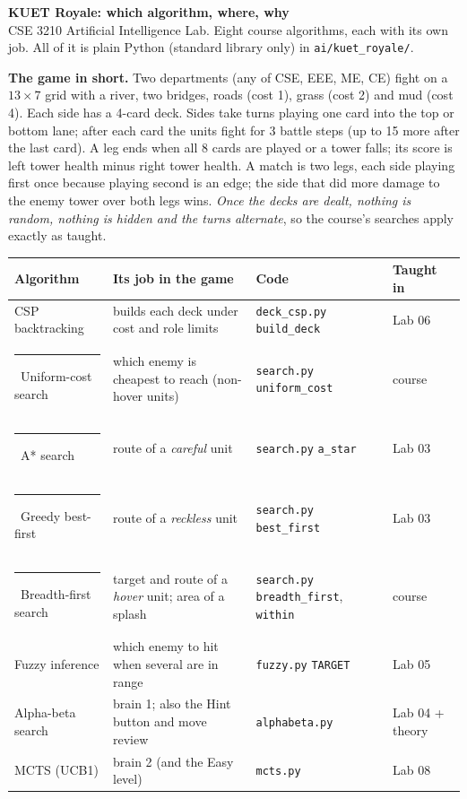 \documentclass[10pt,a4paper]{article}
\newcommand{\swatch}[1]{\textcolor{#1}{\rule{7pt}{7pt}}}
\begin{document}
{\color{navy}\LARGE\bfseries KUET Royale: which algorithm, where, why}\\[2pt]
{\color{soft}CSE 3210 Artificial Intelligence Lab. Eight course algorithms, each with its own job. All of it is plain Python (standard library only) in \texttt{ai/kuet\_royale/}.}

\vspace{6pt}
\textbf{The game in short.} Two departments (any of CSE, EEE, ME, CE) fight on a $13\times7$ grid with a river, two bridges, roads (cost 1), grass (cost 2) and mud (cost 4). Each side has a 4-card deck. Sides take turns playing one card into the top or bottom lane; after each card the units fight for 3 battle steps (up to 15 more after the last card). A leg ends when all 8 cards are played or a tower falls; its score is left tower health minus right tower health. A match is two legs, each side playing first once because playing second is an edge; the side that did more damage to the enemy tower over both legs wins. \emph{Once the decks are dealt, nothing is random, nothing is hidden and the turns alternate}, so the course's searches apply exactly as taught.

\vspace{4pt}
\begin{tabular}{@{}>{\raggedright\arraybackslash}p{3.75cm}>{\raggedright\arraybackslash}p{6.05cm}>{\raggedright\arraybackslash}p{4.15cm}>{\raggedright\arraybackslash}p{2.75cm}@{}}
\toprule
\textbf{Algorithm} & \textbf{Its job in the game} & \textbf{Code} & \textbf{Taught in}\\
\midrule
CSP backtracking & builds each deck under cost and role limits & \texttt{deck\_csp.py} \texttt{build\_deck} & Lab 06\\
\swatch{ucs}\ Uniform-cost search & which enemy is cheapest to reach (non-hover units) & \texttt{search.py} \texttt{uniform\_cost} & course\\
\swatch{astar}\ A* search & route of a \emph{careful} unit & \texttt{search.py} \texttt{a\_star} & Lab 03\\
\swatch{greedy}\ Greedy best-first & route of a \emph{reckless} unit & \texttt{search.py} \texttt{best\_first} & Lab 03\\
\swatch{bfs}\ Breadth-first search & target and route of a \emph{hover} unit; area of a splash & \texttt{search.py} \texttt{breadth\_first}, \texttt{within} & course\\
Fuzzy inference & which enemy to hit when several are in range & \texttt{fuzzy.py} \texttt{TARGET} & Lab 05\\
Alpha-beta search & brain 1; also the Hint button and move review & \texttt{alphabeta.py} & Lab 04 + theory\\
MCTS (UCB1) & brain 2 (and the Easy level) & \texttt{mcts.py} & Lab 08\\
\bottomrule
\end{tabular}
\end{document}
